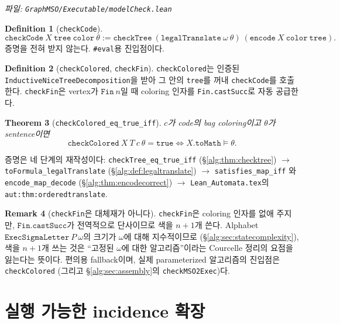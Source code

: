 \documentclass[11pt]{article}
\theoremstyle{definition}
\newtheorem{definition}{Definition}[section]
\newtheorem{remark}[definition]{Remark}
\theoremstyle{plain}
\newtheorem{theorem}[definition]{Theorem}
\newcommand{\lean}[1]{\texttt{#1}}
\newcommand{\leanfile}[1]{\texttt{#1}}
\begin{document}
\emph{파일: \leanfile{GraphMSO/Executable/modelCheck.lean}}

\begin{definition}[\lean{checkCode}]
\label{alg:def:checkcode}
\[
  \lean{checkCode}\ X\ \lean{tree}\ \lean{color}\ \theta :=
    \lean{checkTree}\ (\lean{legalTranslate}\ \omega\ \theta)\ (\lean{encode}\ X\ \lean{color}\ \lean{tree}).
\]
증명을 전혀 받지 않는다. \lean{\#eval}용 진입점이다.
\end{definition}

\begin{definition}[\lean{checkColored}, \lean{checkFin}]
\label{alg:def:checkcolored}
\lean{checkColored}는 인증된 \lean{InductiveNiceTreeDecomposition}을 받아
그 안의 \lean{tree}를 꺼내 \lean{checkCode}를 호출한다.
\lean{checkFin}은 vertex가 $\lean{Fin}\ n$일 때 coloring 인자를
\lean{Fin.castSucc}로 자동 공급한다.
\end{definition}

\begin{theorem}[\lean{checkColored\_eq\_true\_iff}]
\label{alg:thm:checkcolored}
$c$가 code의 bag coloring이고 $\theta$가 sentence이면
\[
  \lean{checkColored}\ X\ T\ c\ \theta = \lean{true}
  \iff
  X.\lean{toMath} \models \theta.
\]
\end{theorem}

증명은 네 단계의 재작성이다: \lean{checkTree\_eq\_true\_iff}
(\S\ref{alg:thm:checktree}) $\to$ \lean{toFormula\_legalTranslate}
(\S\ref{alg:def:legaltranslate}) $\to$ \lean{satisfies\_map\_iff} 와
\lean{encode\_map\_decode} (\S\ref{alg:thm:encodecorrect}) $\to$
\leanfile{Lean\_Automata.tex}의 \lean{aut:thm:orderedtranslate}.

\begin{remark}[\lean{checkFin}은 대체재가 아니다]
\label{alg:rem:checkfin}
\lean{checkFin}은 coloring 인자를 없애 주지만, $\lean{Fin.castSucc}$가
전역적으로 단사이므로 색을 $n+1$개 쓴다. Alphabet
$\lean{ExecSigmaLetter}\ P\ \omega$의 크기가 $\omega$에 대해 지수적이므로
(\S\ref{alg:sec:statecomplexity}), 색을 $n+1$개 쓰는 것은 ``고정된 $\omega$에
대한 알고리즘''이라는 Courcelle 정리의 요점을 잃는다는 뜻이다. 편의용
fallback이며, 실제 parameterized 알고리즘의 진입점은 \lean{checkColored}
(그리고 \S\ref{alg:sec:assembly}의 \lean{checkMSO2Exec})다.
\end{remark}

\section{실행 가능한 incidence 확장}
\label{alg:sec:execincidence}
\end{document}
